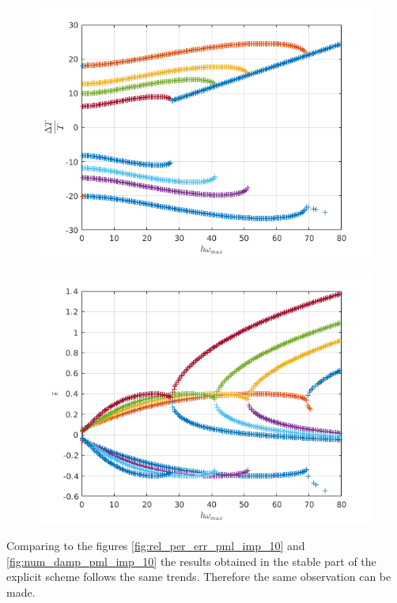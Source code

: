 \begin{itemize}
\begin{figure}[H]
\centering
\begin{minipage}{.5\textwidth}
  \centering
  \includegraphics[width=.90\linewidth]{images/rel_per_err_pml_exp_10.png}
  \label{fig:rel_per_err_pml_exp_10}
\end{minipage}%
\begin{minipage}{.5\textwidth}
  \centering
  \includegraphics[width=.99\linewidth]{images/num_damp_pml_exp_10.png}
  \label{fig:num_damp_pml_exp_10}
\end{minipage}
\end{figure}   
Comparing to the figures \ref{fig:rel_per_err_pml_imp_10} and \ref{fig:num_damp_pml_imp_10} the results obtained in the stable part of the explicit scheme follows the same trends. Therefore the same observation can be made. 
\end{itemize} 
